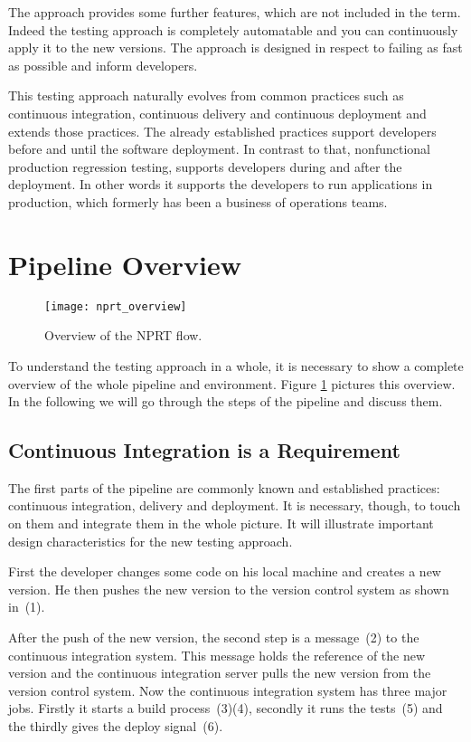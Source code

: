 The approach provides some further features, which are not included in the term. Indeed
the testing approach is completely automatable and you can continuously apply it to the
new versions. The approach is designed in respect to failing as fast as possible and
inform developers.

This testing approach naturally evolves from common practices such as continuous
integration, continuous delivery and continuous deployment and extends those
practices. The already established practices support developers before and until the
software deployment. In contrast to that, nonfunctional production regression testing,
supports developers during and after the deployment. In other words it supports the
developers to run applications in production, which formerly has been a business of
operations teams.

\section{Pipeline Overview}

\begin{figure}[htbp]
  \texttt{[image: nprt\_overview]}
  \caption[nprtflow]{Overview of the NPRT flow.}
  \label{fig:nprt_flow}
\end{figure}

To understand the testing approach in a whole, it is necessary to show a complete overview
of the whole pipeline and environment. Figure \ref{fig:nprt_flow} pictures this
overview. In the following we will go through the steps of the pipeline and discuss them.

\subsection{Continuous Integration is a Requirement}

The first parts of the pipeline are commonly known and established practices: continuous
integration, delivery and deployment. It is necessary, though, to touch on them and
integrate them in the whole picture. It will illustrate important design characteristics
for the new testing approach.

First the developer changes some code on his local machine and creates a new version. He
then pushes the new version to the version control system as shown in~(1).

After the push of the new version, the second step is a message~(2) to the continuous
integration system. This message holds the reference of the new version and the continuous
integration server pulls the new version from the version control system. Now the
continuous integration system has three major jobs. Firstly it starts a build
process~(3)(4), secondly it runs the tests~(5) and the thirdly gives the deploy
signal~(6).

